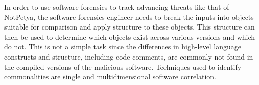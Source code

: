 \documentclass[12pt]{report}
\begin{document}

In order to use software forensics to track advancing threats like that of NotPetya, the software forensics engineer needs to break the inputs into objects suitable for comparison and apply structure to these objects.  This structure can then be used to determine which objects exist across various versions and which do not.  This is not a simple task since the differences in high-level language constructs and structure, including code comments, are commonly not found in the compiled versions of the malicious software.  Techniques used to identify commonalities are single and multidimensional software correlation. 
\end{document}
